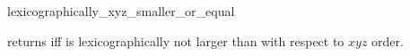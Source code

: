 \begin{ccRefFunction}{lexicographically_xyz_smaller_or_equal}

{returns  iff  is lexicographically not larger
than  with respect to $xyz$ order.}
\end{ccRefFunction}

